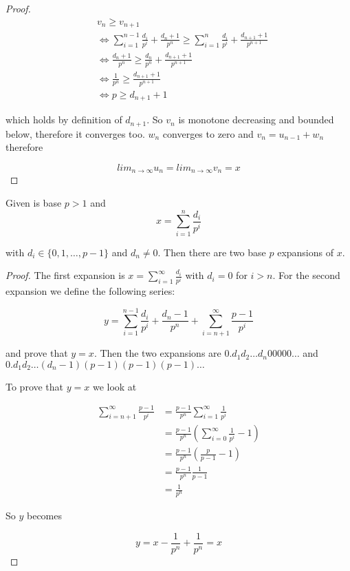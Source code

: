 \begin{proof}
\begin{align*}
& v_n \geq v_{n+1} \\
&\Leftrightarrow \sum_{i = 1}^{n-1} \frac{d_i}{p^i} + \frac{d_n + 1}{p^n} \geq \sum_{i = 1}^n \frac{d_i}{p^i} + \frac{d_{n+1} + 1}{p^{n+1}} \\
&\Leftrightarrow \frac{d_n + 1}{p^n} \geq \frac{d_n}{p^n} + \frac{d_{n+1} + 1}{p^{n+1}} \\
&\Leftrightarrow \frac{1}{p^n} \geq \frac{d_{n+1} + 1}{p^{n+1}} \\
&\Leftrightarrow p \geq d_{n+1} + 1
\end{align*}

which holds by definition of $d_{n+1}$. So $v_n$ is monotone decreasing and bounded below, therefore it converges too. $w_n$ converges to zero and $v_n = u_{n-1} + w_n$ therefore 

$$
lim_{n \to \infty} u_n = lim_{n \to \infty} v_n = x
$$

\end{proof}

\begin{thm}\label{while_a_decimal_expansion_two}
Given is base $p > 1$ and
$$
x = \sum_{i=1}^n \frac{d_i}{p^i}
$$

with $d_i \in \{0, 1, \ldots, p-1\}$ and $d_n \neq 0$. Then there are two base $p$ expansions of $x$.
\end{thm}

\begin{proof}

The first expansion is $x = \sum_{i=1}^\infty \frac{d_i}{p^i}$ with $d_i = 0$ for $i > n$. For the second expansion we define the following series:

$$
y = \sum_{i=1}^{n-1} \frac{d_i}{p^i} + \frac{d_n - 1}{p^n} + \sum_{i=n+1}^\infty \frac{p-1}{p^i}
$$

and prove that $y = x$. Then the two expansions are $0.d_1d_2 \ldots d_n00000 \ldots$ and $0.d_1d_2 \ldots (d_n-1)(p-1)(p-1)(p-1) \ldots$

To prove that $y = x$ we look at

\begin{align*}
\sum_{i=n+1}^\infty \frac{p-1}{p^i} &= \frac{p-1}{p^n} \sum_{i=1}^\infty \frac{1}{p^i} \\
                                    &= \frac{p-1}{p^n} (\sum_{i=0}^\infty \frac{1}{p^i} - 1) \\
                                    &= \frac{p-1}{p^n} (\frac{p}{p-1} - 1) \\
                                    &= \frac{p-1}{p^n} \frac{1}{p-1} \\
                                    &= \frac{1}{p^n}
\end{align*}

So $y$ becomes

$$
y = x - \frac{1}{p^n} + \frac{1}{p^n} = x
$$
\end{proof}

